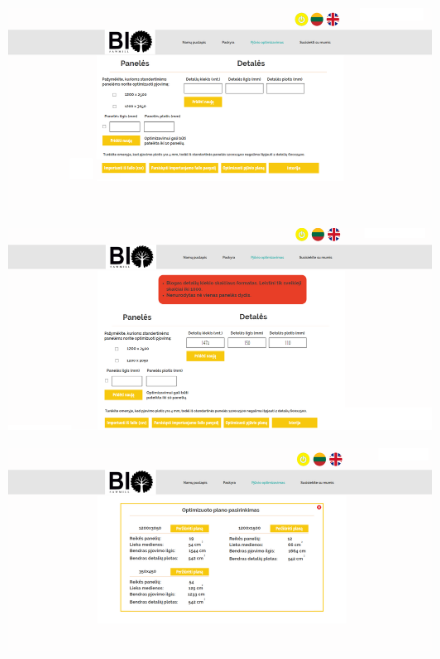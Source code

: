 \documentclass[a4paper,12pt]{article}
\begin{document}
\begin{figure}[!tph]
\hspace{-3cm}
\centering
\includegraphics[scale=0.5]{interfeisai/optimizavimoPuslapisPrisijungus}
\label{fig:verticalcell}
\end{figure}

\begin{figure}[!tph]
\hspace{-3cm}
\centering
\includegraphics[scale=0.5]{interfeisai/optimizavimoPuslapisPrisijungusSuKlaida}
\label{fig:verticalcell}
\end{figure}


\begin{figure}[!tph]
\hspace{-3cm}
\centering
\includegraphics[scale=0.5]{interfeisai/optimizavimoPuslapisOptimizuotiPlanai}
\label{fig:verticalcell}
\end{figure}
\clearpage
\end{document}
